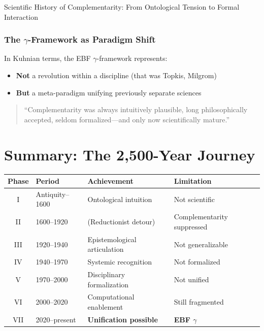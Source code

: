 \begin{chapter}{Scientific History of Complementarity: From Ontological Tension to Formal Interaction}
\subsubsection{The $\gamma$-Framework as Paradigm Shift}

In Kuhnian terms, the EBF $\gamma$-framework represents:

\begin{itemize}
    \item \textbf{Not} a revolution within a discipline (that was Topkis, Milgrom)
    \item \textbf{But} a meta-paradigm unifying previously separate sciences
\end{itemize}

\begin{quote}
``Complementarity was always intuitively plausible, long philosophically accepted, seldom formalized---and only now scientifically mature.''
\end{quote}

\section{Summary: The 2,500-Year Journey}
\label{sec:summary}

\begin{tcolorbox}[colback=gray!5!white,colframe=gray!75!black,title=\textbf{Historical Summary}]

\renewcommand{\arraystretch}{1.4}
\begin{tabular}{@{}clll@{}}
\toprule
\textbf{Phase} & \textbf{Period} & \textbf{Achievement} & \textbf{Limitation} \\
\midrule
I & Antiquity--1600 & Ontological intuition & Not scientific \\
II & 1600--1920 & (Reductionist detour) & Complementarity suppressed \\
III & 1920--1940 & Epistemological articulation & Not generalizable \\
IV & 1940--1970 & Systemic recognition & Not formalized \\
V & 1970--2000 & Disciplinary formalization & Not unified \\
VI & 2000--2020 & Computational enablement & Still fragmented \\
VII & 2020--present & \textbf{Unification possible} & \textbf{EBF $\gamma$} \\
\bottomrule
\end{tabular}


\end{tcolorbox}
\end{chapter}
